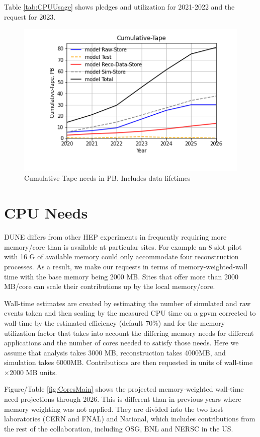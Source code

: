 \documentclass[12pt]{article}
\begin{document}
Table \ref{tab:CPUUsage} shows pledges and utilization for 2021-2022 and the request for 2023.

\begin{figure}[h]
\centering\includegraphics[height=0.4\textwidth]{Parameters_2022-11-21-2026/Parameters_2022-11-21-2026-Cumulative-Tape.png}

\caption{Cumulative Tape needs in PB. Includes data lifetimes}\label{fig:Cumulative-Tape}
\end{figure}

\clearpage
\section{CPU Needs}

DUNE differs from other HEP experiments in frequently requiring more memory/core than is available at particular sites.  For example an 8 slot pilot with 16 G of available memory could only accommodate four reconstruction processes.   As a result, we make our requests in terms of memory-weighted-wall time with the base memory being 2000 MB.  Sites that offer more than 2000 MB/core can scale their contributions up by the local memory/core.

Wall-time estimates are created by estimating the number of simulated and raw events taken and then scaling by the measured CPU time on a gpvm corrected to wall-time by the estimated efficiency (default 70\%) and for the memory utilization factor that takes into account the differing memory needs for different applications and the number of cores needed to satisfy those needs.  Here we assume that analysis takes 3000 MB, reconstruction takes 4000MB, and simulation takes 6000MB.  Contributions are then requested in units of wall-time$\times$2000 MB units. 

Figure/Table \ref{fig:CoresMain} shows the projected memory-weighted wall-time need projections through 2026.  This is different than in previous years where memory weighting was not applied.   They are divided into the two host laboratories (CERN and FNAL) and National, which includes contributions from the rest of the collaboration, including OSG, BNL and NERSC in the US. 
\end{document}
